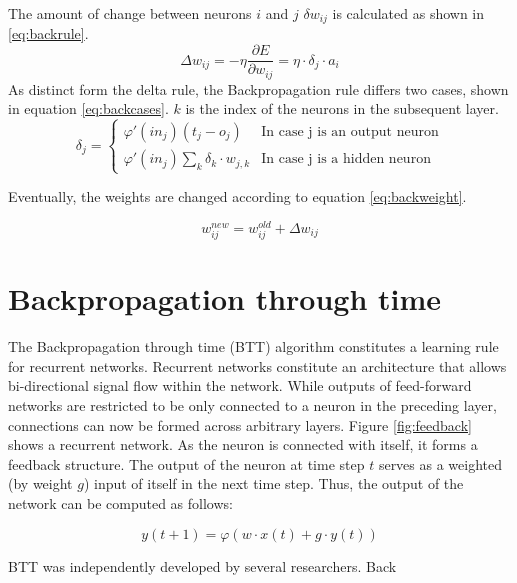 \documentclass[10pt,a4paper,DIV=11]{scrreprt}
\begin{document}
The amount of change between neurons $i$ and $j$ $\delta w_{ij}$ is calculated as shown in \eqref{eq:backrule}.
\begin{equation}
\Delta w_{ij} = -\eta \frac{\partial E}{\partial w_{ij}} = \eta \cdot \delta_j \cdot a_i
\label{eq:backrule}
\end{equation}
As distinct form the delta rule, the Backpropagation rule differs two cases, shown in equation \eqref{eq:backcases}. $k$ is the index of the neurons in the subsequent layer.
\begin{equation}
   \delta_j =
   \begin{cases}
     \varphi'(in_j)(t_j-o_j) & \text{In case j is an output neuron} \\
     \varphi'(in_j)\sum_{k} \delta_k \cdot w_{j,k} & \text{In case j is a hidden neuron}
   \end{cases}
\label{eq:backcases}
\end{equation}

Eventually, the weights are changed according to equation \eqref{eq:backweight}.

\begin{equation}
   w_{ij}^{new} = w_{ij}^{old} + \Delta w_{ij}
\label{eq:backweight}
\end{equation}

\section{Backpropagation through time}

The Backpropagation through time (BTT) algorithm constitutes a learning rule for recurrent networks. 
Recurrent networks constitute an architecture that allows bi-directional signal flow within the network. While outputs of feed-forward networks are restricted to be only connected to 
a neuron in the preceding layer, connections can now be formed across arbitrary layers. Figure \ref{fig:feedback} shows a recurrent network. As the neuron is connected with
itself, it forms a feedback structure. The output of the neuron at time step $t$ serves as a weighted (by weight $g$) input of itself in the next time step.
Thus, the output of the network can be computed as follows:

\begin{equation}
    y(t+1) = \varphi(w\cdot x(t) + g\cdot y(t))
\label{eq:btt}
\end{equation}

BTT was independently developed by several researchers.%
Back
\end{document}
